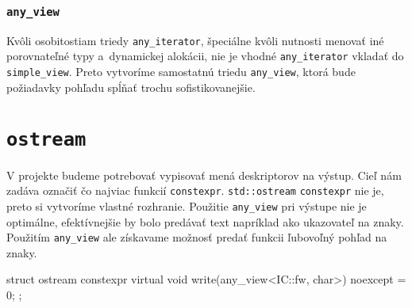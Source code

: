 \subsubsection{\texttt{any\_view}}

Kvôli osobitostiam triedy \texttt{any\_iterator}, špeciálne kvôli nutnosti menovať iné porovnateľné typy a~dynamickej alokácii, nie je vhodné \texttt{any\_iterator} vkladať do \texttt{simple\_view}. Preto vytvoríme samostatnú triedu \texttt{any\_view}, ktorá bude požiadavky pohľadu spĺňať trochu sofistikovanejšie.

\section{\texttt{ostream}}

V projekte budeme potrebovať vypisovať mená deskriptorov na výstup. Cieľ nám zadáva označiť čo najviac funkcií \texttt{constexpr}. \texttt{std::ostream} \texttt{constexpr} nie je, preto si vytvoríme vlastné rozhranie. Použitie \texttt{any\_view} pri výstupe nie je optimálne, efektívnejšie by bolo predávať text napríklad ako ukazovateľ na znaky. Použitím \texttt{any\_view} ale získavame možnosť predať funkcii ľubovoľný pohľad na znaky.

\begin{code}
struct ostream
{ constexpr virtual void write(any_view<IC::fw, char>) noexcept = 0; };
\end{code}